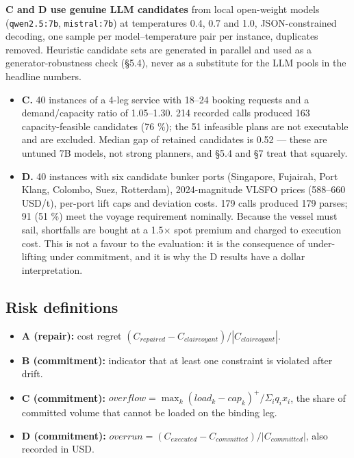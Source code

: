 \documentclass[preprint,12pt,letterpaper]{elsarticle}
\theoremstyle{definition}
\theoremstyle{plain}
\begin{document}
\textbf{C and D use genuine LLM candidates} from local open-weight models (\texttt{qwen2.5:7b}, \texttt{mistral:7b}) at temperatures 0.4, 0.7 and 1.0, JSON-constrained decoding, one sample per model--temperature pair per instance, duplicates removed. Heuristic candidate sets are generated in parallel and used as a generator-robustness check (\S 5.4), never as a substitute for the LLM pools in the headline numbers.

\begin{itemize}
\item \textbf{C.} 40 instances of a 4-leg service with 18--24 booking requests and a demand/capacity ratio of 1.05--1.30. 214 recorded calls produced 163 capacity-feasible candidates (76 \%); the 51 infeasible plans are not executable and are excluded. Median gap of retained candidates is 0.52 --- these are untuned 7B models, not strong planners, and \S 5.4 and \S 7 treat that squarely.
\item \textbf{D.} 40 instances with six candidate bunker ports (Singapore, Fujairah, Port Klang, Colombo, Suez, Rotterdam), 2024-magnitude VLSFO prices (588--660 USD/t), per-port lift caps and deviation costs. 179 calls produced 179 parses; 91 (51 \%) meet the voyage requirement nominally. Because the vessel must sail, shortfalls are bought at a 1.5$\times$ spot premium and charged to execution cost. This is not a favour to the evaluation: it is the consequence of under-lifting under commitment, and it is why the D results have a dollar interpretation.
\end{itemize}

\subsection{Risk definitions}

\begin{itemize}
\item \textbf{A (repair):} cost regret $(C_{repaired} - C_{clairvoyant})/|C_{clairvoyant}|$.
\item \textbf{B (commitment):} indicator that at least one constraint is violated after drift.
\item \textbf{C (commitment):} $overflow = \max _{k} (load_{k} - cap_{k})^+ / \Sigma_{i} q_{i} x_{i}$, the share of committed volume that cannot be loaded on the binding leg.
\item \textbf{D (commitment):} $overrun = (C_{executed} - C_{committed})/|C_{committed}|$, also recorded in USD.
\end{itemize}
\end{document}
